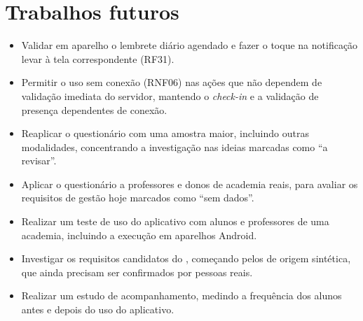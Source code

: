 \section{Trabalhos futuros}

\begin{itemize}
      \item Validar em aparelho o lembrete diário agendado e fazer o toque
        na notificação levar à tela correspondente (RF31).
  \item Permitir o uso sem conexão (RNF06) nas ações que não dependem de
        validação imediata do servidor, mantendo o \textit{check-in} e a
        validação de presença dependentes de conexão.
  \item Reaplicar o questionário com uma amostra maior, incluindo
        outras modalidades, concentrando a investigação nas ideias marcadas
        como ``a revisar''.
  \item Aplicar o questionário a professores e donos de academia reais,
        para avaliar os requisitos de gestão hoje marcados como ``sem
        dados''.
  \item Realizar um teste de uso do aplicativo com alunos e professores
        de uma academia, incluindo a execução em aparelhos Android.
  \item Investigar os requisitos candidatos do ,
        começando pelos de origem sintética, que ainda precisam ser
        confirmados por pessoas reais.
  \item Realizar um estudo de acompanhamento, medindo a frequência dos
        alunos antes e depois do uso do aplicativo.
\end{itemize}